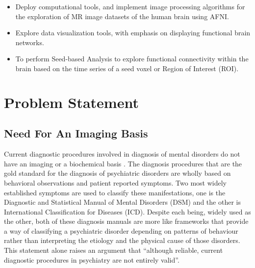 \documentclass[12pt]{article}
\begin{document}
\begin{itemize}

  \item Deploy computational tools, and implement image processing
    algorithms for the exploration of MR image datasets of the human
    brain using AFNI.

  \item Explore data visualization tools, with emphasis on displaying
    functional brain networks.

  \item To perform Seed-based Analysis  to explore functional
    connectivity within the brain based on the time series of a seed
    voxel or Region of Interest (ROI).

\end{itemize}


\newpage

\section{Problem Statement} %

\subsection{Need For An Imaging Basis} %

Current diagnostic procedures involved in diagnosis of mental
disorders do not have an imaging or a biochemical basis
\cite{nobiochemicalbasis} \cite{noimagingbasis}. The diagnosis
procedures that are the gold standard for the diagnosis of psychiatric
disorders are wholly based on behavioral observations and patient
reported symptoms. Two most widely established symptoms are used to
classify these manifestations, one is the Diagnostic and Statistical
Manual of Mental Disorders (DSM) and the other is International
Classification for Diseases (ICD). Despite each being, widely used as
the other, both of these diagnosis manuals are more like frameworks
that provide a way of classifying a psychiatric disorder depending on
patterns of behaviour rather than interpreting the etiology and the
physical cause of those disorders. This statement alone raises an
argument that ``although reliable, current diagnostic procedures in
psychiatry are not entirely valid''.
\end{document}
